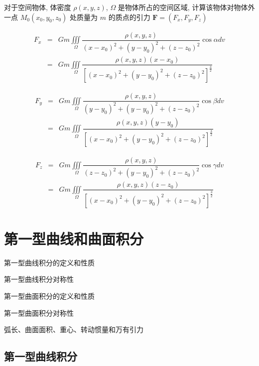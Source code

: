 \begin{theorem}[万有引力 $F = G\frac{m_{1}m_{2}}{r^{2}}$]

	对于空间物体, 体密度 $\rho(x,y,z)$, $\Omega$ 是物体所占的空间区域, 计算该物体对物体外一点 $M_{0}(x_{0},y_{0},z_{0})$ 处质量为 $m$ 的质点的引力 $\boldsymbol{F} = (F_{x},F_{y},F_{z})$
	
	\begin{eqnarray*}
		F_{x} & = & Gm \iiint\limits_{\Omega}\dfrac{\rho(x,y,z)}{(x-x_{0})^{2}+(y-y_{0})^{2}+(z-z_{0})^{2}}\cos\alpha dv \\
		      & = & Gm \iiint\limits_{\Omega}\dfrac{\rho(x,y,z)(x-x_{0})}{\left[(x-x_{0})^{2}+(y-y_{0})^{2}+(z-z_{0})^{2}\right]^{\frac{3}{2}}}
	\end{eqnarray*}

	\begin{eqnarray*}
		F_{y} & = & Gm \iiint\limits_{\Omega}\dfrac{\rho(x,y,z)}{(y-y_{0})^{2}+(y-y_{0})^{2}+(z-z_{0})^{2}}\cos\beta dv \\
		      & = & Gm \iiint\limits_{\Omega}\dfrac{\rho(x,y,z)(y-y_{0})}{\left[(x-x_{0})^{2}+(y-y_{0})^{2}+(z-z_{0})^{2}\right]^{\frac{3}{2}}}
	\end{eqnarray*}

	\begin{eqnarray*}
		F_{z} & = & Gm \iiint\limits_{\Omega}\dfrac{\rho(x,y,z)}{(z-z_{0})^{2}+(y-y_{0})^{2}+(z-z_{0})^{2}}\cos\gamma dv \\
		      & = & Gm \iiint\limits_{\Omega}\dfrac{\rho(x,y,z)(z-z_{0})}{\left[(x-x_{0})^{2}+(y-y_{0})^{2}+(z-z_{0})^{2}\right]^{\frac{3}{2}}}
	\end{eqnarray*}
\end{theorem}


\chapter{第一型曲线和曲面积分}
\begin{introduction}
	\item 第一型曲线积分的定义和性质
	\item 第一型曲线积分对称性
	\item 第一型曲面积分的定义和性质
	\item 第一型曲面积分对称性
	\item 弧长、曲面面积、重心、转动惯量和万有引力
\end{introduction}
\section{第一型曲线积分}

